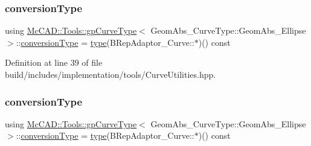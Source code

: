 \subsubsection{\texorpdfstring{conversion\+Type}{conversionType}\hspace{0.1cm}{\footnotesize\ttfamily [1/2]}}
{\footnotesize\ttfamily using \hyperlink{structMcCAD_1_1Tools_1_1gpCurveType}{Mc\+C\+A\+D\+::\+Tools\+::gp\+Curve\+Type}$<$ Geom\+Abs\+\_\+\+Curve\+Type\+::\+Geom\+Abs\+\_\+\+Ellipse $>$\+::\hyperlink{structMcCAD_1_1Tools_1_1gpCurveType_3_01GeomAbs__CurveType_1_1GeomAbs__Ellipse_01_4_a0a0d12fadf9056491f9ea92a4f59b293}{conversion\+Type} =  \hyperlink{structMcCAD_1_1Tools_1_1gpCurveType_3_01GeomAbs__CurveType_1_1GeomAbs__Ellipse_01_4_a5a6977fe73eccc98c1ba004cd9a751cb}{type}(B\+Rep\+Adaptor\+\_\+\+Curve\+::$\ast$)() const}



Definition at line 39 of file build/includes/implementation/tools/\+Curve\+Utilities.\+hpp.

\mbox{\label{structMcCAD_1_1Tools_1_1gpCurveType_3_01GeomAbs__CurveType_1_1GeomAbs__Ellipse_01_4_a0a0d12fadf9056491f9ea92a4f59b293}} 
\subsubsection{\texorpdfstring{conversion\+Type}{conversionType}\hspace{0.1cm}{\footnotesize\ttfamily [2/2]}}
{\footnotesize\ttfamily using \hyperlink{structMcCAD_1_1Tools_1_1gpCurveType}{Mc\+C\+A\+D\+::\+Tools\+::gp\+Curve\+Type}$<$ Geom\+Abs\+\_\+\+Curve\+Type\+::\+Geom\+Abs\+\_\+\+Ellipse $>$\+::\hyperlink{structMcCAD_1_1Tools_1_1gpCurveType_3_01GeomAbs__CurveType_1_1GeomAbs__Ellipse_01_4_a0a0d12fadf9056491f9ea92a4f59b293}{conversion\+Type} =  \hyperlink{structMcCAD_1_1Tools_1_1gpCurveType_3_01GeomAbs__CurveType_1_1GeomAbs__Ellipse_01_4_a5a6977fe73eccc98c1ba004cd9a751cb}{type}(B\+Rep\+Adaptor\+\_\+\+Curve\+::$\ast$)() const}



